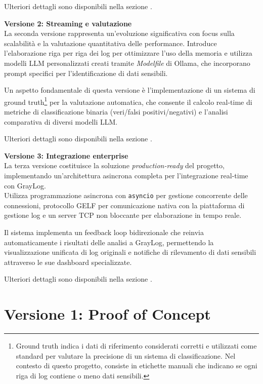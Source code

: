 \documentclass[12pt]{report}
\begin{document}
Ulteriori dettagli sono disponibili nella sezione .

\textbf{Versione 2: Streaming e valutazione} \\
La seconda versione rappresenta un'evoluzione significativa con focus sulla scalabilità e la valutazione quantitativa delle performance. Introduce l'elaborazione riga per riga dei log per ottimizzare l'uso della memoria e utilizza modelli LLM personalizzati creati tramite \textit{Modelfile} di Ollama, che incorporano prompt specifici per l'identificazione di dati sensibili.

Un aspetto fondamentale di questa versione è l'implementazione di un sistema di ground truth\footnote{Ground truth indica i dati di riferimento considerati corretti e utilizzati come standard per valutare la precisione di un sistema di classificazione. Nel contesto di questo progetto, consiste in etichette manuali che indicano se ogni riga di log contiene o meno dati sensibili.} per la valutazione automatica, che consente il calcolo real-time di metriche di classificazione binaria (veri/falsi positivi/negativi) e l'analisi comparativa di diversi modelli LLM.

Ulteriori dettagli sono disponibili nella sezione .

\textbf{Versione 3: Integrazione enterprise} \\
La terza versione costituisce la soluzione \textit{production-ready} del progetto, implementando un'architettura asincrona completa per l'integrazione real-time con GrayLog. \\
Utilizza programmazione asincrona con \texttt{asyncio} per gestione concorrente delle connessioni, protocollo GELF per comunicazione nativa con la piattaforma di gestione log e un server TCP non bloccante per elaborazione in tempo reale.

Il sistema implementa un feedback loop bidirezionale che reinvia automaticamente i risultati delle analisi a GrayLog, permettendo la visualizzazione unificata di log originali e notifiche di rilevamento di dati sensibili attraverso le sue dashboard specializzate.

Ulteriori dettagli sono disponibili nella sezione .


\section{Versione 1: Proof of Concept}
\label{sec:ver1}
\end{document}
